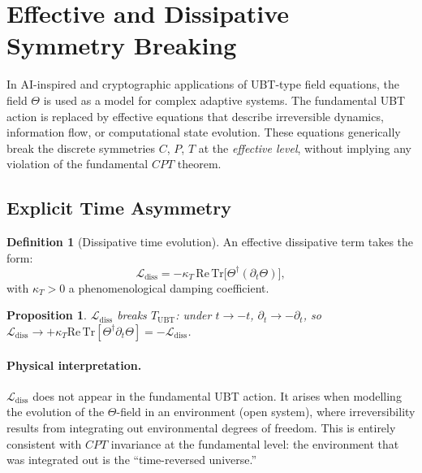 \documentclass[12pt,a4paper]{article}
\newtheorem{proposition}[theorem]{Proposition}
\theoremstyle{definition}
\newtheorem{definition}[theorem]{Definition}
\theoremstyle{remark}
\begin{document}
\section{Effective and Dissipative Symmetry Breaking}
\label{sec:cat:effective}

In AI-inspired and cryptographic applications of UBT-type field equations,
the field $\Theta$ is used as a model for complex adaptive systems.
The fundamental UBT action is replaced by effective equations that describe
irreversible dynamics, information flow, or computational state evolution.
These equations generically break the discrete symmetries $C$, $P$, $T$ at
the \emph{effective level}, without implying any violation of the
fundamental $CPT$ theorem.

\subsection{Explicit Time Asymmetry}
\label{subsec:cat:time_asym}

\begin{definition}[Dissipative time evolution]
\label{def:cat:dissipation}
An effective dissipative term takes the form:
\begin{equation}
  \mathcal{L}_{\mathrm{diss}}
  = -\kappa_T\,\mathrm{Re}\,\mathrm{Tr}\!\bigl[
      \Theta^\dagger (\partial_t \Theta)
    \bigr],
  \label{eq:cat:L_diss}
\end{equation}
with $\kappa_T > 0$ a phenomenological damping coefficient.
\end{definition}

\begin{proposition}
$\mathcal{L}_{\mathrm{diss}}$ breaks $T_{\mathrm{UBT}}$: under $t \to -t$,
$\partial_t \to -\partial_t$, so
$\mathcal{L}_{\mathrm{diss}} \to +\kappa_T \mathrm{Re}\,\mathrm{Tr}[\Theta^\dagger \partial_t\Theta]
= -\mathcal{L}_{\mathrm{diss}}$.
\end{proposition}

\paragraph{Physical interpretation.}
$\mathcal{L}_{\mathrm{diss}}$ does not appear in the fundamental UBT action.
It arises when modelling the evolution of the $\Theta$-field in an environment
(open system), where irreversibility results from integrating out environmental
degrees of freedom.  This is entirely consistent with $CPT$ invariance at the
fundamental level: the environment that was integrated out is the ``time-reversed
universe.''
\end{document}
